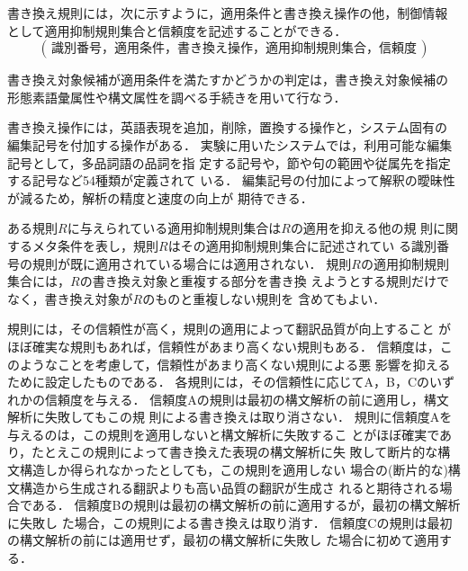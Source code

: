 書き換え規則には，次に示すように，適用条件と書き換え操作の他，制御情報
として適用抑制規則集合と信頼度を記述することができる．
\[ (\,識別番号，適用条件，書き換え操作，適用抑制規則集合，信頼度\,) \]

書き換え対象候補が適用条件を満たすかどうかの判定は，書き換え対象候補の
形態素語彙属性や構文属性を調べる手続きを用いて行なう．

書き換え操作には，英語表現を追加，削除，置換する操作と，システム固有の
編集記号を付加する操作がある．
実験に用いたシステムでは，利用可能な編集記号として，多品詞語の品詞を指
定する記号や，節や句の範囲や従属先を指定する記号など54種類が定義されて
いる．
編集記号の付加によって解釈の曖昧性が減るため，解析の精度と速度の向上が
期待できる．

ある規則$R$に与えられている適用抑制規則集合は$R$の適用を抑える他の規
則に関するメタ条件を表し，規則$R$はその適用抑制規則集合に記述されてい
る識別番号の規則が既に適用されている場合には適用されない．
規則$R$の適用抑制規則集合には，$R$の書き換え対象と重複する部分を書き換
えようとする規則だけでなく，書き換え対象が$R$のものと重複しない規則を
含めてもよい．

規則には，その信頼性が高く，規則の適用によって翻訳品質が向上すること
がほぼ確実な規則もあれば，信頼性があまり高くない規則もある．
信頼度は，このようなことを考慮して，信頼性があまり高くない規則による悪
影響を抑えるために設定したものである．
各規則には，その信頼性に応じてA，B，Cのいずれかの信頼度を与える．
信頼度Aの規則は最初の構文解析の前に適用し，構文解析に失敗してもこの規
則による書き換えは取り消さない．
規則に信頼度Aを与えるのは，この規則を適用しないと構文解析に失敗するこ
とがほぼ確実であり，たとえこの規則によって書き換えた表現の構文解析に失
敗して断片的な構文構造しか得られなかったとしても，この規則を適用しない
場合の(断片的な)構文構造から生成される翻訳よりも高い品質の翻訳が生成さ
れると期待される場合である．
信頼度Bの規則は最初の構文解析の前に適用するが，最初の構文解析に失敗し
た場合，この規則による書き換えは取り消す．
信頼度Cの規則は最初の構文解析の前には適用せず，最初の構文解析に失敗し
た場合に初めて適用する．


